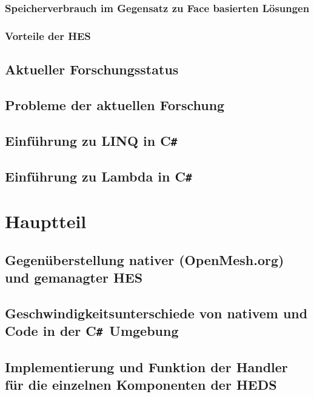 \documentclass[12pt,a4paper]{scrreprt}
\newcommand{\CS}{C\texttt{\#}}
\newcommand{\CSS}{C\texttt{\# }}
\begin{document}
		\subsection {Speicherverbrauch im Gegensatz zu Face basierten Lösungen}
		\subsection {Vorteile der HES}
	\section {Aktueller Forschungsstatus}
	\section {Probleme der aktuellen Forschung}
	\section {Einführung zu LINQ in \CS}
	\section {Einführung zu Lambda in \CS}




\chapter {Hauptteil}
	\section {Gegenüberstellung nativer (OpenMesh.org) und gemanagter HES}
	\section {Geschwindigkeitsunterschiede von nativem und Code in der \CSS Umgebung}
	\section {Implementierung und Funktion der Handler für die einzelnen Komponenten der HEDS}
\end{document}
